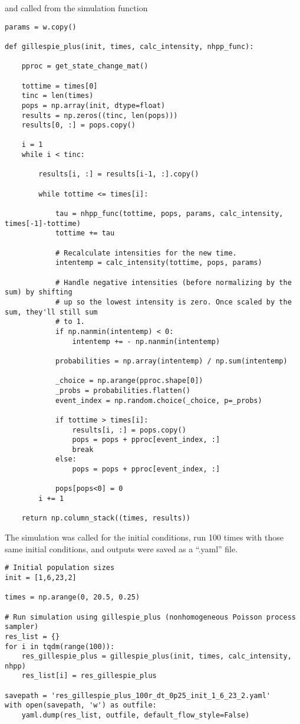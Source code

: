 \documentclass[11pt]{article}
\begin{document}
and called from the simulation function
\begin{Verbatim}[frame=single]
params = w.copy()

def gillespie_plus(init, times, calc_intensity, nhpp_func):

    pproc = get_state_change_mat()

    tottime = times[0]
    tinc = len(times)
    pops = np.array(init, dtype=float)
    results = np.zeros((tinc, len(pops)))
    results[0, :] = pops.copy()

    i = 1
    while i < tinc:
        
        results[i, :] = results[i-1, :].copy()
        
        while tottime <= times[i]:

            tau = nhpp_func(tottime, pops, params, calc_intensity, times[-1]-tottime)
            tottime += tau

            # Recalculate intensities for the new time.
            intentemp = calc_intensity(tottime, pops, params)

            # Handle negative intensities (before normalizing by the sum) by shifting 
            # up so the lowest intensity is zero. Once scaled by the sum, they'll still sum
            # to 1.
            if np.nanmin(intentemp) < 0:
                intentemp += - np.nanmin(intentemp)

            probabilities = np.array(intentemp) / np.sum(intentemp)

            _choice = np.arange(pproc.shape[0])
            _probs = probabilities.flatten()
            event_index = np.random.choice(_choice, p=_probs)
            
            if tottime > times[i]:
                results[i, :] = pops.copy()
                pops = pops + pproc[event_index, :]
                break
            else:
                pops = pops + pproc[event_index, :]

            pops[pops<0] = 0
        i += 1

    return np.column_stack((times, results))
\end{Verbatim}
The simulation was called for the initial conditions, run 100 times with those same initial conditions, and outputs were saved as a ``.yaml'' file.
\begin{Verbatim}[frame=single]
# Initial population sizes
init = [1,6,23,2]

times = np.arange(0, 20.5, 0.25)

# Run simulation using gillespie_plus (nonhomogeneous Poisson process sampler)
res_list = {}
for i in tqdm(range(100)):
    res_gillespie_plus = gillespie_plus(init, times, calc_intensity, nhpp)
    res_list[i] = res_gillespie_plus

savepath = 'res_gillespie_plus_100r_dt_0p25_init_1_6_23_2.yaml'
with open(savepath, 'w') as outfile:
    yaml.dump(res_list, outfile, default_flow_style=False)
\end{Verbatim}
\end{document}

